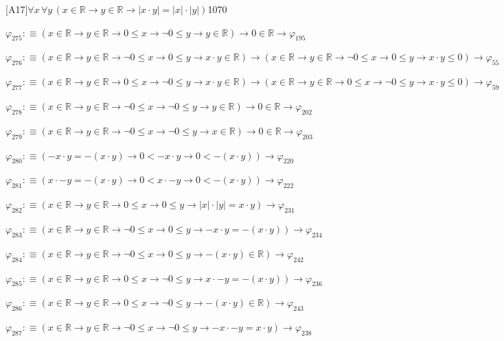 \begin{fullproof}{[A17]}{$\forall x\,\forall y\,(x \in \mathbb{R} \to y \in \mathbb{R} \to \lvert x \cdot y \rvert = \lvert x \rvert \cdot \lvert y \rvert)$}{1070}
\begin{abbrevlist}
\item $\varphi_{275} :\equiv (x \in \mathbb{R} \to y \in \mathbb{R} \to 0 \leq x \to \neg 0 \leq y \to y \in \mathbb{R}) \to 0 \in \mathbb{R} \to \varphi_{195}$
\item $\varphi_{276} :\equiv (x \in \mathbb{R} \to y \in \mathbb{R} \to \neg 0 \leq x \to 0 \leq y \to x \cdot y \in \mathbb{R}) \to (x \in \mathbb{R} \to y \in \mathbb{R} \to \neg 0 \leq x \to 0 \leq y \to x \cdot y \leq 0) \to \varphi_{55}$
\item $\varphi_{277} :\equiv (x \in \mathbb{R} \to y \in \mathbb{R} \to 0 \leq x \to \neg 0 \leq y \to x \cdot y \in \mathbb{R}) \to (x \in \mathbb{R} \to y \in \mathbb{R} \to 0 \leq x \to \neg 0 \leq y \to x \cdot y \leq 0) \to \varphi_{59}$
\item $\varphi_{278} :\equiv (x \in \mathbb{R} \to y \in \mathbb{R} \to \neg 0 \leq x \to \neg 0 \leq y \to y \in \mathbb{R}) \to 0 \in \mathbb{R} \to \varphi_{202}$
\item $\varphi_{279} :\equiv (x \in \mathbb{R} \to y \in \mathbb{R} \to \neg 0 \leq x \to \neg 0 \leq y \to x \in \mathbb{R}) \to 0 \in \mathbb{R} \to \varphi_{203}$
\item $\varphi_{280} :\equiv (-x \cdot y = -(x \cdot y) \to 0 < -x \cdot y \to 0 < -(x \cdot y)) \to \varphi_{220}$
\item $\varphi_{281} :\equiv (x \cdot -y = -(x \cdot y) \to 0 < x \cdot -y \to 0 < -(x \cdot y)) \to \varphi_{222}$
\item $\varphi_{282} :\equiv (x \in \mathbb{R} \to y \in \mathbb{R} \to 0 \leq x \to 0 \leq y \to \lvert x \rvert \cdot \lvert y \rvert = x \cdot y) \to \varphi_{231}$
\item $\varphi_{283} :\equiv (x \in \mathbb{R} \to y \in \mathbb{R} \to \neg 0 \leq x \to 0 \leq y \to -x \cdot y = -(x \cdot y)) \to \varphi_{234}$
\item $\varphi_{284} :\equiv (x \in \mathbb{R} \to y \in \mathbb{R} \to \neg 0 \leq x \to 0 \leq y \to -(x \cdot y) \in \mathbb{R}) \to \varphi_{242}$
\item $\varphi_{285} :\equiv (x \in \mathbb{R} \to y \in \mathbb{R} \to 0 \leq x \to \neg 0 \leq y \to x \cdot -y = -(x \cdot y)) \to \varphi_{236}$
\item $\varphi_{286} :\equiv (x \in \mathbb{R} \to y \in \mathbb{R} \to 0 \leq x \to \neg 0 \leq y \to -(x \cdot y) \in \mathbb{R}) \to \varphi_{243}$
\item $\varphi_{287} :\equiv (x \in \mathbb{R} \to y \in \mathbb{R} \to \neg 0 \leq x \to \neg 0 \leq y \to -x \cdot -y = x \cdot y) \to \varphi_{238}$

\end{abbrevlist}
\end{fullproof}
